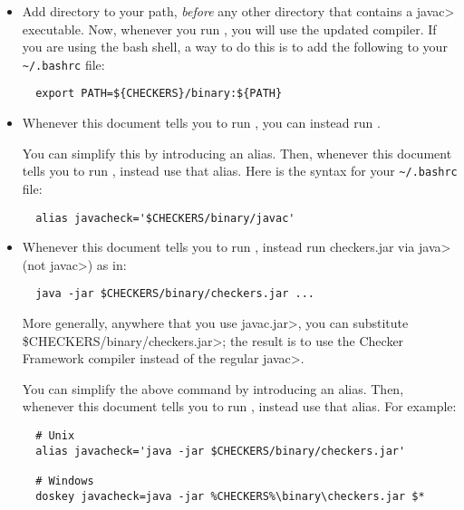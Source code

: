 \begin{enumerate}

  \begin{itemize}
  \item
    Add directory
     to your path, \emph{before} any other
    directory that contains a \<javac> executable.  Now, whenever
    you run , you will use the updated compiler.  If you are
    using the bash shell, a way to do this is to add the following to your
    \verb|~/.bashrc| file:
\begin{Verbatim}
  export PATH=${CHECKERS}/binary:${PATH}
\end{Verbatim}
  \item
    Whenever this document tells you to run , you
    can instead run .

    You can simplify this by introducing an alias.  Then,
    whenever this document tells you to run , instead use that
    alias.  Here is the syntax for your 
    \verb|~/.bashrc| file:
\begin{Verbatim}
  alias javacheck='$CHECKERS/binary/javac'
\end{Verbatim}

 \item
   Whenever this document tells you to run , instead
   run checkers.jar via \<java> (not \<javac>) as in:

\begin{Verbatim}
  java -jar $CHECKERS/binary/checkers.jar ...
\end{Verbatim}

   More generally, anywhere that you use \<javac.jar>, you can substitute
   \<\$CHECKERS/binary/checkers.jar>; the result is to use the Checker
   Framework compiler instead of the regular \<javac>.


    You can simplify the above command by introducing an alias.  Then,
    whenever this document tells you to run , instead use that
    alias.  For example:

\begin{Verbatim}
  # Unix
  alias javacheck='java -jar $CHECKERS/binary/checkers.jar'

  # Windows
  doskey javacheck=java -jar %CHECKERS%\binary\checkers.jar $*
\end{Verbatim}
\end{itemize}

\end{enumerate}


